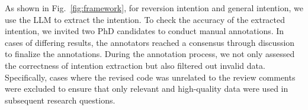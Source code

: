 As shown in Fig.~\ref{fig:framework}, for reversion intention and general intention, we use the LLM to extract the intention. To check the accuracy of the extracted intention, we invited two PhD candidates to conduct manual annotations. In cases of differing results, the annotators reached a consensus through discussion to finalize the annotations. During the annotation process, we not only assessed the correctness of intention extraction but also filtered out invalid data. Specifically, cases where the revised code was unrelated to the review comments were excluded to ensure that only relevant and high-quality data were used in subsequent research questions.








